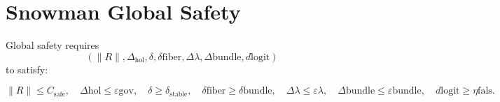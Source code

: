 \documentclass[11pt]{article}
\begin{document}
\section{Snowman Global Safety}

Global safety requires
\[
(\|R\|, \Delta_{\mathrm{hol}}, \delta,
\delta{\mathrm{fiber}}, \Delta{\lambda},
\Delta{\mathrm{bundle}}, d{\mathrm{logit}})
\]
to satisfy:

\[
\|R\| \leq C_{\mathrm{safe}}, \quad
\Delta{\mathrm{hol}} \leq \varepsilon{\mathrm{gov}}, \quad
\delta \geq \delta_{\mathrm{stable}}, \quad
\delta{\mathrm{fiber}} \geq \delta{\mathrm{bundle}}, \quad
\Delta{\lambda} \leq \varepsilon{\lambda}, \quad
\Delta{\mathrm{bundle}} \leq \varepsilon{\mathrm{bundle}}, \quad
d{\mathrm{logit}} \geq \eta{\mathrm{fals}}.
\]
\end{document}
